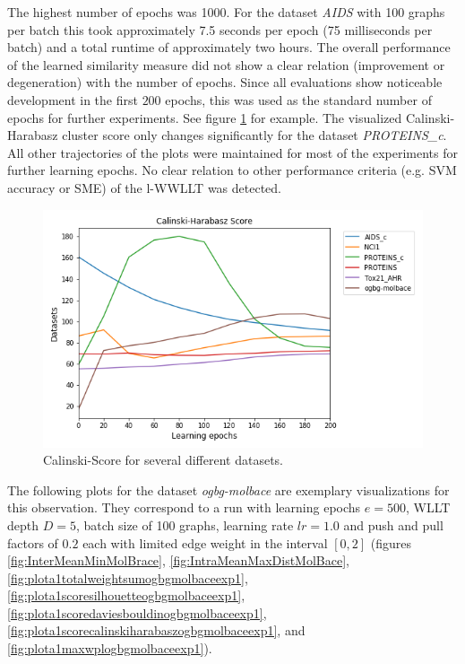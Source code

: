 		The highest number of epochs was 1000.
		For the dataset \textit{AIDS} with 100 graphs per batch this took approximately 7.5 seconds per epoch (75 milliseconds per batch) and a total runtime of approximately two hours.
		The overall performance of the learned similarity measure did not show a clear relation (improvement or degeneration) with the number of epochs.
		Since all evaluations show noticeable development in the first $200$ epochs, this was used as the standard number of epochs for further experiments.
		See figure \ref{fig:plota1massevalscorecalinski} for example. 
		The visualized Calinski-Harabasz cluster score only changes significantly for the dataset \textit{PROTEINS\_c}.
		All other trajectories of the plots were maintained for most of the experiments for further learning epochs.
		No clear relation to other performance criteria (e.g. SVM accuracy or SME) of the l-WWLLT was detected.
		
		\begin{figure}[H]
			\centering
			\includegraphics[width=\linewidth]{images/plotA1_MassCHS.png}
			\caption{Calinski-Score for several different datasets.}
			\label{fig:plota1massevalscorecalinski}
		\end{figure}
		
		The following plots for the dataset \textit{ogbg-molbace} are exemplary visualizations for this observation.
		They correspond to a run with learning epochs $e=500$, WLLT depth $D=5$, batch size of 100 graphs, learning rate $lr=1.0$ and push and pull factors of $0.2$ each with limited edge weight in the interval $[0,2]$ (figures \ref{fig:InterMeanMinMolBrace}, \ref{fig:IntraMeanMaxDistMolBace}, \ref{fig:plota1totalweightsumogbgmolbaceexp1}, \ref{fig:plota1scoresilhouetteogbgmolbaceexp1}, \ref{fig:plota1scoredaviesbouldinogbgmolbaceexp1}, \ref{fig:plota1scorecalinskiharabaszogbgmolbaceexp1}, and \ref{fig:plota1maxwplogbgmolbaceexp1}).
		
